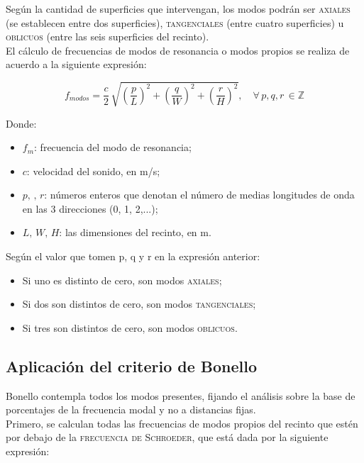 Según la cantidad de superficies que intervengan, los modos podrán ser \textsc{axiales} (se establecen entre dos superficies), \textsc{tangenciales} (entre cuatro superficies) u \textsc{oblicuos} (entre las seis superficies del recinto).\\

El cálculo de frecuencias de modos de resonancia o modos propios se realiza de acuerdo a la siguiente expresión:

\begin{equation}
	f_{modos} = \frac{c}{2}\,\sqrt{\left(\frac{p}{L} \right)^2 + \left(\frac{q}{W} \right)^2 + \left(\frac{r}{H} \right)^2},\quad \forall\, p,q,r \,\in \mathbb{Z}
\end{equation}

Donde:

\begin{itemize}
	\item $f_m$: frecuencia del modo de resonancia;
	\item $c$: velocidad del sonido, en m/s;
	\item $p,\,,\,r$: números enteros que denotan el número de medias longitudes de onda en las 3 direcciones (0, 1, 2,...);
	\item $L,\,W,\,H$: las dimensiones del recinto, en m.
\end{itemize}

Según el valor que tomen p, q y r en la expresión anterior:

\begin{itemize}
	\item Si uno es distinto de cero, son modos \textsc{axiales};
	\item Si dos son distintos de cero, son modos \textsc{tangenciales};
	\item Si tres son distintos de cero, son modos \textsc{oblicuos}.
\end{itemize}

\subsection{Aplicación del criterio de Bonello}

Bonello contempla todos los modos presentes, fijando el análisis sobre la base de porcentajes de la frecuencia modal y no a distancias fijas.\\ 

Primero, se calculan todas las frecuencias de modos propios del recinto que estén por debajo de la \textsc{frecuencia de Schroeder}, que está dada por la siguiente expresión:

